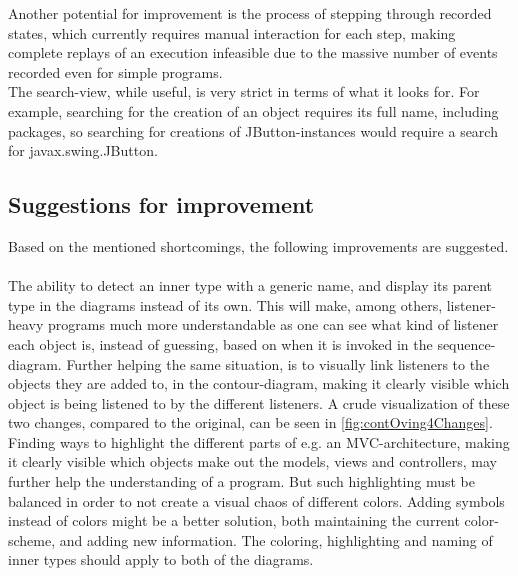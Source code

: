 Another potential for improvement is the process of stepping through recorded states, which currently requires manual interaction for each step, making complete replays of an execution infeasible due to the massive number of events recorded even for simple programs.
~\\

The search-view, while useful, is very strict in terms of what it looks for.
For example, searching for the creation of an object requires its full name, including packages, so searching for creations of JButton-instances would require a search for javax.swing.JButton.
~\\

\subsection{Suggestions for improvement}\label{jiveSuggestions}

Based on the mentioned shortcomings, the following improvements are suggested.
~\\

The ability to detect an inner type with a generic name, and display its parent type in the diagrams instead of its own.
This will make, among others, listener-heavy programs much more understandable as one can see what kind of listener each object is, instead of guessing, based on when it is invoked in the sequence-diagram.
Further helping the same situation, is to visually link listeners to the objects they are added to, in the contour-diagram, making it clearly visible which object is being listened to by the different listeners.
A crude visualization of these two changes, compared to the original, can be seen in \autoref{fig:contOving4Changes}.
~\\

Finding ways to highlight the different parts of e.g. an MVC-architecture, making it clearly visible which objects make out the models, views and controllers, may further help the understanding of a program.
But such highlighting must be balanced in order to not create a visual chaos of different colors.
Adding symbols instead of colors might be a better solution, both maintaining the current color-scheme, and adding new information.
The coloring, highlighting and naming of inner types should apply to both of the diagrams.
~\\

